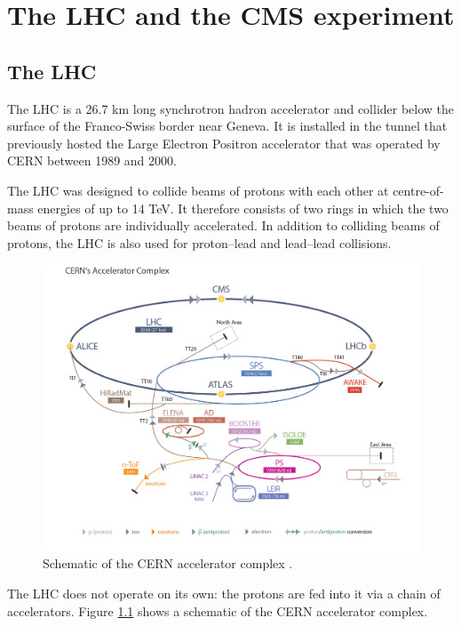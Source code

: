 \chapter{The \acs{LHC} and the \acs{CMS} experiment}
\label{chap:CMSLHC}

\section{The \acs{LHC}}
\label{sec:CMSLHC_LHC}

The \acf{LHC} \cite{lhc-machine}  is a 26.7 km long synchrotron hadron accelerator and collider below the surface of the 
Franco-Swiss border near Geneva. It
is installed in the tunnel that previously hosted the Large Electron Positron accelerator \cite{lep-design}
that was operated by \acf{CERN} between 1989 and 2000.

The \ac{LHC} was designed to collide beams of protons with each other at centre-of-mass
energies of up to 14 TeV. It therefore consists of two rings in which the two beams
of protons are individually accelerated. In addition to colliding beams of protons, the \ac{LHC}
is also used for proton--lead and lead--lead collisions.
\begin{figure}[h!]
\includegraphics[width=\textwidth]{./Detector/Plots/LHC_default.jpg}
\caption{Schematic of the \ac{CERN} accelerator complex \cite{lhc-schematic}.}
\label{fig:lhc_schematic}
\end{figure}
The \ac{LHC} does not operate on its own: the protons are fed into
it via a chain of accelerators. Figure \ref{fig:lhc_schematic} shows a schematic
of the \ac{CERN} accelerator complex.


